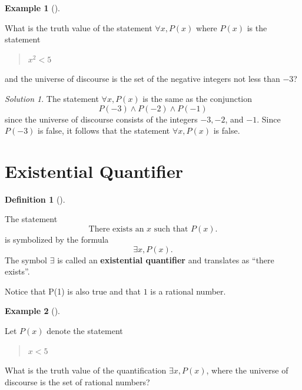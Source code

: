 \documentclass[
  letterpaper,
  10pt,
  reqno,
  twopage,
  openany]{book}
\theoremstyle{plain}
\theoremstyle{definition}
\theoremstyle{definition}
\newtheorem{definition}{Definition}[chapter]
\theoremstyle{definition}
\newtheorem{example}{Example}[chapter]
\theoremstyle{plain}
\theoremstyle{plain}
\theoremstyle{remark}
\newtheorem*{solution}{Solution}
\begin{document}
\leavevmode{}%
\begin{example}[]\label{exm-tass}

What is the truth value of the statement \(\forall x, P(x)\) where
\(P(x)\) is the statement

\begin{quote}
\(x^2<5\)
\end{quote}

and the universe of discourse is the set of the negative integers not
less than \(-3\)?

\end{example}

\begin{solution}

The statement \(\forall x, P(x)\) is the same as the conjunction \[
P(-3)\land P(-2)\land P(-1)
\] since the universe of discourse consists of the integers \(-3, -2\),
and \(-1\). Since \(P(-3)\) is false, it follows that the statement
\(\forall x, P(x)\) is false.

\end{solution}

\hypertarget{existential-quantifier}{%
\section{Existential Quantifier}\label{existential-quantifier}}

\leavevmode{}%
\begin{definition}[]\label{def-existential-quantifier}

The statement \[
\text{There exists an $x$ such that $P(x)$.}
\] is symbolized by the formula \[
\exists x, P(x).
\] The symbol \(\exists\) is called an 
\textbf{existential quantifier} and translates as ``there exists''.

\end{definition}

Notice that P(1) is also true and that \(1\) is a rational number.

\leavevmode{}%
\begin{example}[]\label{exm-eq-1}

Let \(P(x)\) denote the statement

\begin{quote}
\(x<5\)
\end{quote}

What is the truth value of the quantification \(\exists x, P(x)\), where
the universe of discourse is the set of rational numbers?

\end{example}
\end{document}
